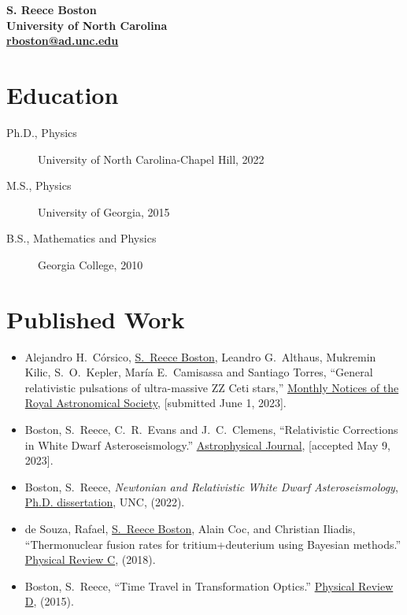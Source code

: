 \documentclass[11pt]{article}
\begin{document}
\begin{center}
{\bf \large S. Reece Boston}\\
{\bf University of North Carolina}\\
{\bf \href{mailto:rboston@ad.unc.edu}{rboston@ad.unc.edu}}
\end{center}

\section*{Education}
\begin{minipage}{\textwidth}
	\begin{description}
		\item[Ph.D., Physics] University of North Carolina-Chapel Hill, 2022
		\item[M.S., Physics] University of Georgia, 2015%
		\item[B.S., Mathematics and Physics] Georgia College, 2010%
	\end{description}
\end{minipage}

\section*{Published Work}
%
\begin{itemize}
		\item Alejandro H.~C\'orsico, \underline{S.~Reece Boston}, Leandro G.~Althaus, Mukremin Kilic,
S.~O.~Kepler, Mar\'ia E.~Camisassa and Santiago Torres, ``General relativistic pulsations of ultra-massive ZZ Ceti stars,'' \href{}{Monthly Notices of the Royal Astronomical Society}, [submitted June 1, 2023].
		\item Boston, S.~Reece, C.~R.~Evans and J.~C.~Clemens, ``Relativistic Corrections in White Dwarf Asteroseismology.'' \href{}{Astrophysical Journal}, [accepted May 9, 2023].
		\item Boston, S.~Reece, \emph{Newtonian and Relativistic White Dwarf Asteroseismology}, \href{https://cdr.lib.unc.edu/concern/dissertations/jw827n44n?locale=en}{Ph.D. dissertation}, UNC, (2022).
		\item de Souza, Rafael, \underline{S.~Reece Boston}, Alain Coc, and Christian Iliadis, ``Thermonuclear fusion rates for tritium+deuterium using Bayesian methods.''  \href{http://journals.aps.org/prc/abstract/10.1103/PhysRevC.99.014619}{Physical Review C}, (2018).
		\item Boston, S.~Reece, ``Time Travel in Transformation Optics.''  \href{http://journals.aps.org/prd/abstract/10.1103/PhysRevD.91.124035}{Physical Review D}, (2015).
\end{itemize}
\end{document}
